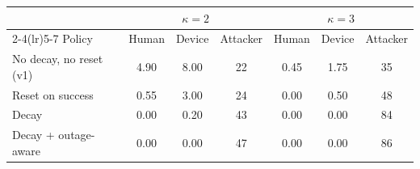 \begin{tabular}{@{}lcccccc@{}}
\toprule
 & \multicolumn{3}{c}{$\kappa=2$} & \multicolumn{3}{c}{$\kappa=3$} \\
\cmidrule(lr){2-4}\cmidrule(lr){5-7}
Policy & Human & Device & Attacker & Human & Device & Attacker \\
\midrule
No decay, no reset (v1) & 4.90 & 8.00 & 22 & 0.45 & 1.75 & 35 \\
Reset on success & 0.55 & 3.00 & 24 & 0.00 & 0.50 & 48 \\
Decay & 0.00 & 0.20 & 43 & 0.00 & 0.00 & 84 \\
Decay + outage-aware & 0.00 & 0.00 & 47 & 0.00 & 0.00 & 86 \\
\bottomrule
\end{tabular}
